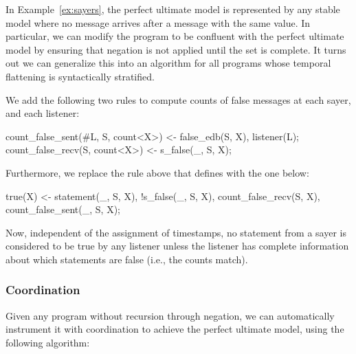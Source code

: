 In Example~\ref{ex:sayers}, the perfect ultimate model is represented by any stable model where no  message arrives after a  message with the same value.  In particular, we can modify the program to be confluent with the perfect ultimate model by ensuring that negation is not applied until the  set is complete.  It turns out we can generalize this into an algorithm for all \lang programs whose temporal flattening is syntactically stratified.


We add the following two rules to compute counts of false messages at each sayer, and each listener:

\begin{Dedalus}
count_false_sent(#L, S, count<X>) <- false_edb(S, X),
                                     listener(L);
count_false_recv(S, count<X>) <- s_false(_, S, X);
\end{Dedalus}

Furthermore, we replace the rule above that defines  with the one below:

\begin{Dedalus}
true(X) <- statement(_, S, X), !s_false(_, S, X),
           count_false_recv(S, X),
           count_false_sent(_, S, X);
\end{Dedalus}

Now, independent of the assignment of timestamps, no statement from a sayer  is considered to be true by any listener unless the listener has complete information about which statements are false (i.e., the counts match). 



\subsubsection{Coordination}
Given any \lang program without recursion through negation, we can automatically instrument it with coordination to achieve the perfect ultimate model, using the following algorithm:

